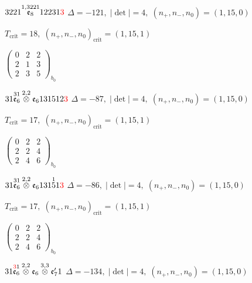 \documentclass[10pt]{article}
\begin{document}
$3221\overset{1,3221}{\mathfrak{e}_8}12231\textcolor{red}{3}$ \quad $\Delta=-121,\; |\det|=4,\; (n_+,n_-,n_0)=(1,15,0)$

\hspace{1em}$T_{\text{crit}}=18,\; (n_+,n_-,n_0)_{\text{crit}}=(1,15,1)$

\hspace{2em}$\left(\begin{smallmatrix}0 & 2 & 2 \\ 2 & 1 & 3 \\ 2 & 3 & 5\end{smallmatrix}\right)_{\!b_0}$

\smallskip

$31\overset{31}{\mathfrak{e}_6}\overset{2,2}{\otimes}\mathfrak{e}_6131512\textcolor{red}{3}$ \quad $\Delta=-87,\; |\det|=4,\; (n_+,n_-,n_0)=(1,15,0)$

\hspace{1em}$T_{\text{crit}}=17,\; (n_+,n_-,n_0)_{\text{crit}}=(1,15,1)$

\hspace{2em}$\left(\begin{smallmatrix}0 & 2 & 2 \\ 2 & 2 & 4 \\ 2 & 4 & 6\end{smallmatrix}\right)_{\!b_0}$

\smallskip

$31\overset{31}{\mathfrak{e}_6}\overset{2,2}{\otimes}\mathfrak{e}_6131\overset{1}{5}1\textcolor{red}{3}$ \quad $\Delta=-86,\; |\det|=4,\; (n_+,n_-,n_0)=(1,15,0)$

\hspace{1em}$T_{\text{crit}}=17,\; (n_+,n_-,n_0)_{\text{crit}}=(1,15,1)$

\hspace{2em}$\left(\begin{smallmatrix}0 & 2 & 2 \\ 2 & 2 & 4 \\ 2 & 4 & 6\end{smallmatrix}\right)_{\!b_0}$

\smallskip

$31\overset{\textcolor{red}{3}1}{\mathfrak{e}_6}\overset{2,2}{\otimes}\mathfrak{e}_6\overset{3,3}{\otimes}\mathfrak{e}_7'1$ \quad $\Delta=-134,\; |\det|=4,\; (n_+,n_-,n_0)=(1,15,0)$
\end{document}
